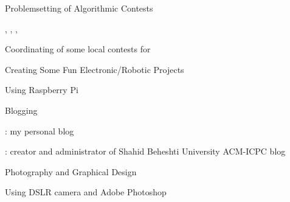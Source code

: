 

\begin{cvprojects}

  \cvproject
    {Problemsetting of Algorithmic Contests} %
    {} %
    {} %
    {} %
    {
      \begin{cvitems} %
        \item {, , , }
        \item {Coordinating of some local contests for }
      \end{cvitems}
    }

  \cvproject
    {Creating Some Fun Electronic/Robotic Projects} %
    {} %
    {} %
    {} %
    {\begin{cvitems}\item{Using Raspberry Pi}\end{cvitems}}

  \cvproject
    {Blogging} %
    {} %
    {} %
    {} %
    {\begin{cvitems}
    \item{: my personal blog}
    \item{: creator and administrator of Shahid Beheshti University ACM-ICPC blog}
    \end{cvitems}}

  \cvproject
    {Photography and Graphical Design} %
    {} %
    {} %
    {} %
    {\begin{cvitems}\item{Using DSLR camera and Adobe Photoshop}\end{cvitems}}

\end{cvprojects}

